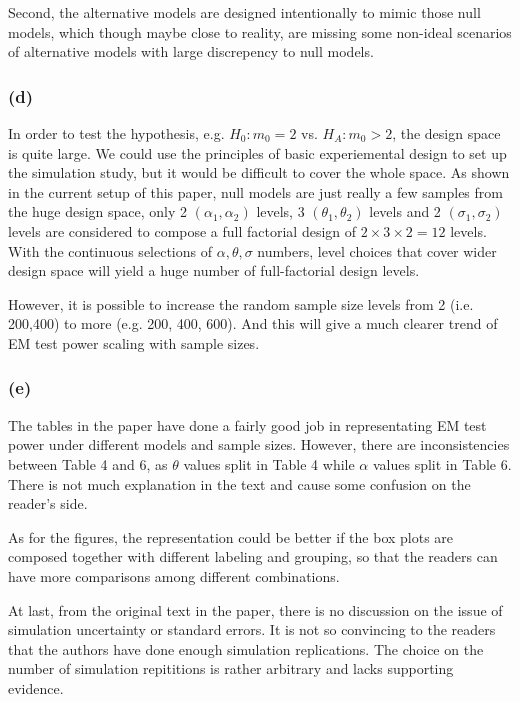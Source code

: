 \documentclass{article}
\begin{document}
Second, the alternative models are designed intentionally to mimic those null models, which though maybe close to reality,
are missing some non-ideal scenarios of alternative models with large discrepency to null models.


\subsubsection*{(d)}

\hspace{12 pt} In order to test the hypothesis, e.g. $H_0: m_0=2$ vs. $H_A: m_0 > 2$, the design space is quite large. 
We could use the principles of basic experiemental design to set up the simulation study, but it would be 
difficult to cover the whole space. As shown in the current setup of this paper, null models are just really a few 
samples from the huge design space, only 2 $(\alpha_1, \alpha_2)$ levels, 3 $(\theta_1, \theta_2)$ levels and
2 $(\sigma_1, \sigma_2)$ levels are considered to compose a full factorial design of $2\times 3\times 2=12$ levels.
With the continuous selections of $\alpha, \theta, \sigma$ numbers, level choices that cover wider design
space will yield a huge number of full-factorial design levels.

However, it is possible to increase the random sample size levels from 2 (i.e. 200,400) to more (e.g. 200, 400, 600). And this will give
a much clearer trend of EM test power scaling with sample sizes.


\subsubsection*{(e)}

\hspace{12 pt} The tables in the paper have done a fairly good job in representating EM test power under different models and sample sizes.
However, there are inconsistencies between Table 4 and 6, as $\theta$ values split in Table 4 while $\alpha$ values
split in Table 6. There is not much explanation in the text and cause some confusion on the reader's side.

As for the figures, the representation could be better if the box plots are composed together with different labeling
and grouping, so that the readers can have more comparisons among different combinations.

At last, from the original text in the paper, there is no discussion on the issue of simulation uncertainty or standard
errors. It is not so convincing to the readers that the authors have done enough simulation replications. The choice on the
number of simulation repititions is rather arbitrary and lacks supporting evidence.
\end{document}
